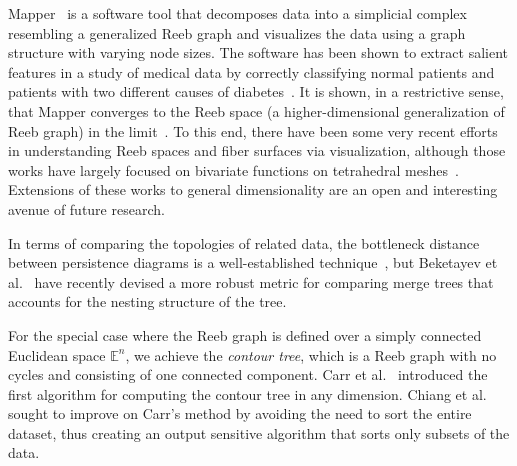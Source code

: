 Mapper~\cite{SinghMemoliCarlsson2007} is a software tool that decomposes data into a simplicial complex resembling a generalized Reeb graph and visualizes the data using a graph structure with varying node sizes.
%
The software has been shown to extract salient features in a study of medical data by correctly classifying normal patients and patients with two different causes of diabetes~\cite{SarikondaPettusPhatak2014}.
%
It is shown, in a restrictive sense, that Mapper converges to the Reeb space (a higher-dimensional generalization of Reeb graph) in the limit~\cite{MunchWang2016}.
%
To this end, there have been some very recent efforts in understanding Reeb spaces and fiber surfaces via visualization, although those works have largely focused on bivariate functions on tetrahedral meshes~\cite{CarrGengTierny2015,KlacanskyTiernyCarr2016,TiernyCarr2016}.
%
Extensions of these works to general dimensionality are an open and interesting avenue of future research.

In terms of comparing the topologies of related data, the bottleneck distance between persistence diagrams is a well-established technique~\cite{Cohen-SteinerEdelsbrunnerHarer2007}, but Beketayev et al.~\cite{BeketayevYeliussizovMorozov2014} have recently devised a more robust metric for comparing merge trees that accounts for the nesting structure of the tree.


For the special case where the Reeb graph is defined over a simply connected Euclidean space $\mathbb{E}^n$, we achieve the \textit{contour tree}, which is a Reeb graph with no cycles and consisting of one connected component.
%
Carr et al.~\cite{CarrSnoeyinkAxen2003} introduced the first algorithm for computing the contour tree in any dimension.
%
Chiang et al.~\cite{ChiangLenzLu2005} sought to improve on Carr's method by avoiding the need to sort the entire dataset, thus creating an output sensitive algorithm that sorts only subsets of the data.
%

